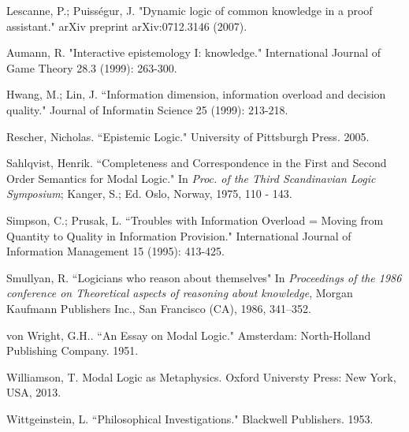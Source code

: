 \begin{thebibliography}{9}
	 	Lescanne, P.; Puiss\'egur, J. "Dynamic logic of common knowledge in a proof assistant." arXiv preprint arXiv:0712.3146 (2007).
	 	
	 	Aumann, R. "Interactive epistemology I: knowledge." International Journal of Game Theory 28.3 (1999): 263-300.
	 	
	 	Hwang, M.; Lin, J. ``Information dimension, information overload and decision quality." Journal of Informatin Science 25 (1999): 213-218.
	 	
	 	Rescher, Nicholas. ``Epistemic Logic." University of Pittsburgh Press. 2005.
	 	
	 	Sahlqvist, Henrik. ``Completeness and Correspondence in the First and Second Order Semantics for Modal Logic." In {\em Proc. of the Third Scandinavian Logic Symposium}; Kanger, S.; Ed. Oslo, Norway, 1975, 110 - 143.
	 	
	 	Simpson, C.; Prusak, L. ``Troubles with Information Overload = Moving from Quantity to Quality in Information Provision." International Journal of Information Management 15 (1995): 413-425.
	 	
	 	Smullyan, R. ``Logicians who reason about themselves" In \emph{Proceedings of the 1986 conference on Theoretical aspects of reasoning about knowledge}, Morgan Kaufmann Publishers Inc., San Francisco (CA), 1986, 341–352.
	 	
	 	von Wright, G.H.. ``An Essay on Modal Logic." Amsterdam: North-Holland Publishing Company. 1951.
	 	
	 	Williamson, T. Modal Logic as Metaphysics. Oxford Universty Press: New York, USA, 2013.
	 	
	 	Wittgeinstein, L. ``Philosophical Investigations." Blackwell Publishers. 1953.
\end{thebibliography}
